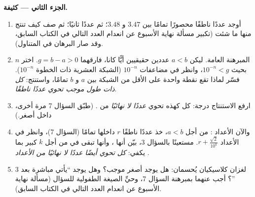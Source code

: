 \begin{problem}
\medskip
\noindent\textbf{الجزء الثاني ---  كثيفة.}
\begin{enumerate}[resume]
  \item أوجد عددًا ناطقًا محصورًا تمامًا بين $3.47$ و $3.48$؛ ثم
        عددًا ثانيًا؛ ثم صف كيف تنتج منها ما شئت
        (تكبير مسألة نهاية الأسبوع عن انعدام العدد التالي في الكتاب السابق، وقد صار
        البرهان في المتناول).
  \item المبرهنة العامة. ليكن $a < b$ عددين حقيقيين أيًّا كانا،
        فارقهما $g = b - a > 0$. اختر $n$ بحيث
        $10^{-n} < g$، وانظر في مضاعفات $10^{-n}$
        (الشبكة العشرية ذات الخطوة $10^{-n}$). فسّر لماذا
        تقع نقطة واحدة على الأقل من الشبكة بين $a$ و $b$ تمامًا،
        واستنتج: \emph{كل  ذات طول موجب
        تحوي عددًا ناطقًا}.
  \item ارفع الاستنتاج درجة: كل  كهذه تحوي
        \emph{عددًا لا نهائيًا} من . (طبّق السؤال 7
        مرة أخرى، داخل  أصغر.)
  \item والآن الأعداد : من أجل $a < b$، خذ عددًا ناطقًا $r$
        داخلها تمامًا (السؤال 7)، وانظر في الأعداد
        $r + \frac{\sqrt2}{10^k}$. مستعينًا بالسؤال 3، بيّن أنها
        ، وأنها تبقى في  من أجل $k$ كبير
        بما يكفي: \emph{كل  تحوي أيضًا
        عددًا لا نهائيًا من الأعداد }.
  \item لغزان كلاسيكيان يُحسمان: هل يوجد أصغر
         موجب؟ وهل يوجد  ``يأتي مباشرة بعد
        $3$''؟ أجب عنهما بمبرهنة السؤال 7، وحيِّ
        الصيغة الطفولية للسؤال
        (مسألة نهاية الأسبوع عن انعدام العدد التالي في الكتاب السابق).
\end{enumerate}


\end{problem}

